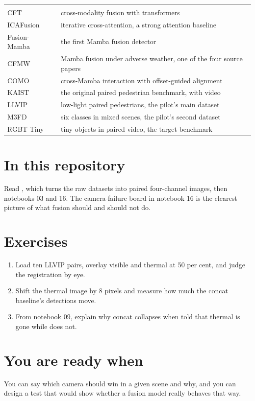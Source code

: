 \begin{tabularx}{\textwidth}{@{}P{5.2cm}L@{}}
 &  \\
CFT~\cite{qingyun2021cft} & cross-modality fusion with transformers \\
ICAFusion~\cite{shen2024icafusion} & iterative cross-attention, a strong attention baseline \\
Fusion-Mamba~\cite{dong2025fusionmamba} & the first Mamba fusion detector \\
CFMW~\cite{li2025cfmw} & Mamba fusion under adverse weather, one of the four source papers \\
COMO~\cite{como2024} & cross-Mamba interaction with offset-guided alignment \\
KAIST~\cite{hwang2015kaist} & the original paired pedestrian benchmark, with video \\
LLVIP~\cite{jia2021llvip} & low-light paired pedestrians, the pilot's main dataset \\
M3FD~\cite{liu2022tardal} & six classes in mixed scenes, the pilot's second dataset \\
RGBT-Tiny~\cite{ying2025rgbttiny} & tiny objects in paired video, the target benchmark \\
\end{tabularx}

\section{In this repository}

Read , which turns the raw datasets into paired four-channel images, then
notebooks 03 and 16. The camera-failure board in notebook 16 is the clearest picture of what fusion should and
should not do.

\section{Exercises}

\begin{enumerate}
  \item Load ten LLVIP pairs, overlay visible and thermal at 50 per cent, and judge the registration by eye.
  \item Shift the thermal image by 8 pixels and measure how much the concat baseline's detections move.
  \item From notebook 09, explain why concat collapses when told that thermal is gone while \method{} does not.
\end{enumerate}

\section{You are ready when}

You can say which camera should win in a given scene and why, and you can design a test that would show whether
a fusion model really behaves that way.
